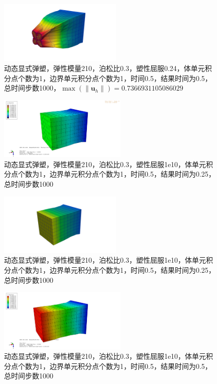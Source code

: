 \begin{figure}[!htbp]
  \centering
  \includegraphics[height=3cm]{fig/4/4.1.5/8-1.png}
  \caption{动态显式弹塑，弹性模量210，泊松比0.3，塑性屈服0.24，体单元积分点个数为1，边界单元积分点个数为1，时间0.5，结果时间为0.5，总时间步数1000，$\max(\|\mathbf u_h\|)=0.7366931105086029$}
  \label{fig:4.1.4:4}
\end{figure}

\begin{figure}[!htbp]
  \centering
  \includegraphics[height=3cm]{fig/4/4.1.5/9.png}
  \caption{动态显式弹塑，弹性模量210，泊松比0.3，塑性屈服1e10，体单元积分点个数为1，边界单元积分点个数为1，时间0.5，结果时间为0.25，总时间步数1000}
  \label{fig:4.1.4:4}
\end{figure}

\begin{figure}[!htbp]
  \centering
  \includegraphics[height=3cm]{fig/4/4.1.5/9-1.png}
  \caption{动态显式弹塑，弹性模量210，泊松比0.3，塑性屈服1e10，体单元积分点个数为1，边界单元积分点个数为1，时间0.5，结果时间为0.25，总时间步数1000}
  \label{fig:4.1.4:4}
\end{figure}

\begin{figure}[!htbp]
  \centering
  \includegraphics[height=3cm]{fig/4/4.1.5/10.png}
  \caption{动态显式弹塑，弹性模量210，泊松比0.3，塑性屈服1e10，体单元积分点个数为1，边界单元积分点个数为1，时间0.5，结果时间为0.5，总时间步数1000}
  \label{fig:4.1.4:4}
\end{figure}


